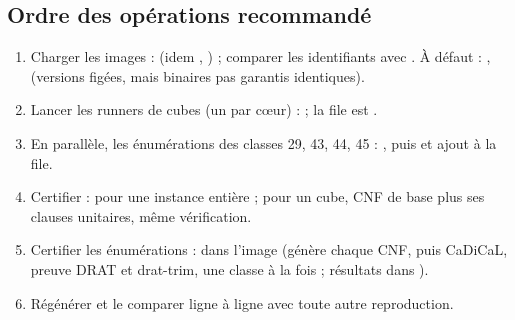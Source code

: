 \subsection{Ordre des opérations recommandé}
{\sloppy
\begin{enumerate}[nosep]
\item Charger les images :  (idem , ) ; comparer les
identifiants avec . À défaut : ,  (versions figées,
mais binaires pas garantis identiques).
\item Lancer les runners de cubes (un par cœur) :
 ; la file est .
\item En parallèle, les énumérations des classes 29, 43, 44, 45 :
, puis  et ajout à la file.
\item Certifier :  pour une instance entière ; pour un cube, CNF de base plus ses clauses unitaires, même vérification.
\item Certifier les énumérations :  dans l'image  (génère chaque CNF, puis CaDiCaL, preuve DRAT et
drat-trim, une classe à la fois ; résultats dans ).
\item Régénérer  et le comparer ligne à ligne avec toute autre reproduction.
\end{enumerate}\par}
